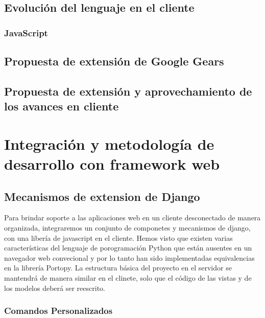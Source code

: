 \documentclass[a4paper]{report}
\begin{document}
\section{Evolución del lenguaje en el cliente}
\subsection{JavaScript}

\section{Propuesta de extensión de Google Gears}
\section{Propuesta de extensión y aprovechamiento de los avances en cliente}





\chapter{Integración y metodología de desarrollo con framework web}
\section{Mecanismos de extension de Django}
Para brindar soporte a las aplicaciones web en un cliente desconectado de 
manera organizada, integraremos un conjunto de componetes y mecanismos
de django, con una libería de javascript en el cliente.
Hemos visto que existen varias características del lenguaje de porogramación
Python que están ausentes en un navegador web convecional y por lo tanto
han sido implementadas equivalencias en la librería Portopy.
La estructura básica del proyecto en el servidor se mantendrá de manera similar
en el clinete, solo que el código de las vistas y de los modelos deberá ser
reescrito.


\subsection{Comandos Personalizados}


\end{document}
